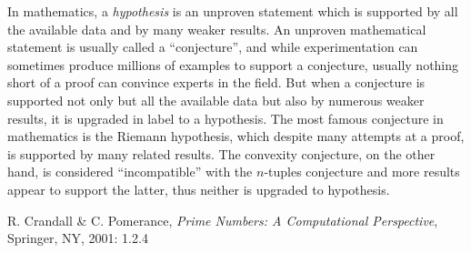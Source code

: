 \documentclass[12pt]{article}
\begin{document}

In mathematics, a {\em hypothesis} is an unproven statement which is supported by all the available data and by many weaker results. An unproven mathematical statement is usually called a ``conjecture'', and while experimentation can sometimes produce millions of examples to support a conjecture, usually nothing short of a proof can convince experts in the field. But when a conjecture is supported not only but all the available data but also by numerous weaker results, it is upgraded in label to a hypothesis. The most famous conjecture in mathematics is the Riemann hypothesis, which despite many attempts at a proof, is supported by many related results. The convexity conjecture, on the other hand, is considered ``incompatible'' with the $n$-tuples conjecture  and more results appear to support the latter, thus neither is upgraded to hypothesis.

\begin{thebibliography}{1}
 R. Crandall \& C. Pomerance, {\it Prime Numbers: A Computational Perspective}, Springer, NY, 2001: 1.2.4
\end{thebibliography}
\end{document}
